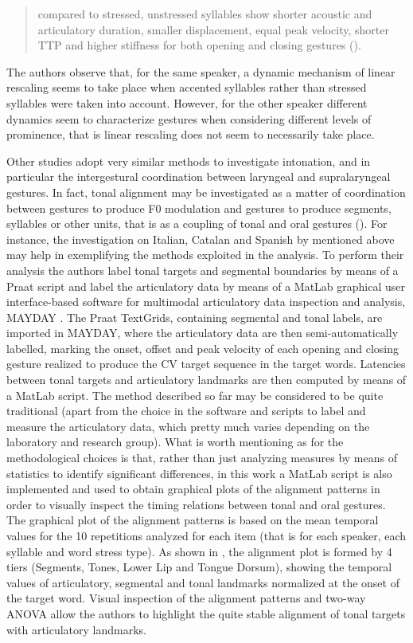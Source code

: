 \documentclass[output=paper]{langsci/langscibook}
\begin{document}
\begin{quote}
compared to stressed, unstressed syllables show shorter acoustic and articulatory duration, smaller displacement, equal peak velocity, shorter TTP and higher stiffness for both opening and closing gestures (\citealt[983]{Avesani2007}).
\end{quote}

The authors observe that, for the same speaker, a dynamic mechanism of linear rescaling seems to take place when accented syllables rather than stressed syllables were taken into account. However, for the other speaker different dynamics seem to characterize gestures when considering different levels of prominence, that is linear rescaling does not seem to necessarily take place.

Other studies adopt very similar methods to investigate intonation, and in particular the intergestural coordination between laryngeal and supralaryngeal gestures. In fact, tonal alignment may be investigated as a matter of coordination between gestures to produce F0 modulation and gestures to produce segments, syllables or other units, that is as a coupling of tonal and oral gestures (\citealt{DImperio2002,Ladd2008,PrietoTorreira2007}). For instance, the investigation on Italian, Catalan and Spanish by \citet{Stella2014} mentioned above may help in exemplifying the methods exploited in the analysis. To perform their analysis the authors label tonal targets and segmental boundaries by means of a Praat script and label the articulatory data by means of a MatLab graphical user interface-based software for multimodal articulatory data inspection and analysis, MAYDAY \citep{Sigona2015}. The Praat TextGrids, containing segmental and tonal labels, are imported in MAYDAY, where the articulatory data are then semi-automatically labelled, marking the onset, offset and peak velocity of each opening and closing gesture realized to produce the CV target sequence in the target words. Latencies between tonal targets and articulatory landmarks are then computed by means of a MatLab script. The method described so far may be considered to be quite traditional (apart from the choice in the software and scripts to label and measure the articulatory data, which pretty much varies depending on the laboratory and research group). What is worth mentioning as for the methodological choices is that, rather than just analyzing measures by means of statistics to identify significant differences, in this work a MatLab script is also implemented and used to obtain graphical plots of the alignment patterns in order to visually inspect the timing relations between tonal and oral gestures. The graphical plot of the alignment patterns is based on the mean temporal values for the 10 repetitions analyzed for each item (that is for each speaker, each syllable and word stress type). As shown in , the alignment plot is formed by 4 tiers (Segments, Tones, Lower Lip and Tongue Dorsum), showing the temporal values of articulatory, segmental and tonal landmarks normalized at the onset of the target word. Visual inspection of the alignment patterns and two-way ANOVA allow the authors to highlight the quite stable alignment of tonal targets with articulatory landmarks. 
\end{document}
